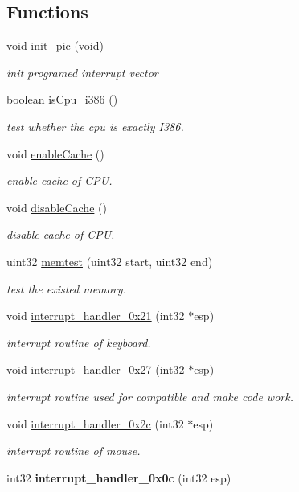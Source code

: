 \subsection*{Functions}
\begin{DoxyCompactItemize}
\item 
void \hyperlink{group__hal_gafbc0dbef6f15e2df21b38724ea38c483}{init\+\_\+pic} (void)
\begin{DoxyCompactList}\small\item\em init programed interrupt vector \end{DoxyCompactList}\item 
boolean \hyperlink{group__hal_ga950bdcbc93f8f964e5725e1aa8b3b5ca}{is\+Cpu\+\_\+i386} ()
\begin{DoxyCompactList}\small\item\em test whether the cpu is exactly I386. \end{DoxyCompactList}\item 
void \hyperlink{group__hal_gaa6c71ad32c0f9672da37fb41f7c061ea}{enable\+Cache} ()
\begin{DoxyCompactList}\small\item\em enable cache of C\+P\+U. \end{DoxyCompactList}\item 
void \hyperlink{group__hal_ga6f714ef9aafc948538caa3ca15a508cc}{disable\+Cache} ()
\begin{DoxyCompactList}\small\item\em disable cache of C\+P\+U. \end{DoxyCompactList}\item 
uint32 \hyperlink{group__hal_ga81897fb798b4a6de7461ec60532ba18c}{memtest} (uint32 start, uint32 end)
\begin{DoxyCompactList}\small\item\em test the existed memory. \end{DoxyCompactList}\item 
void \hyperlink{group__hal_ga69b08db00a381a9cad104bb62187a878}{interrupt\+\_\+handler\+\_\+0x21} (int32 $\ast$esp)
\begin{DoxyCompactList}\small\item\em interrupt routine of keyboard. \end{DoxyCompactList}\item 
void \hyperlink{group__hal_gaf6af72f1d0cb5d5742c565576f375591}{interrupt\+\_\+handler\+\_\+0x27} (int32 $\ast$esp)
\begin{DoxyCompactList}\small\item\em interrupt routine used for compatible and make code work. \end{DoxyCompactList}\item 
void \hyperlink{group__hal_gad9f893ba050719bae099b3b1d5d1146c}{interrupt\+\_\+handler\+\_\+0x2c} (int32 $\ast$esp)
\begin{DoxyCompactList}\small\item\em interrupt routine of mouse. \end{DoxyCompactList}\item 
\hypertarget{group__hal_ga9a683e6357146e328c456aca95e63d6e}{}int32 {\bfseries interrupt\+\_\+handler\+\_\+0x0c} (int32 esp)\label{group__hal_ga9a683e6357146e328c456aca95e63d6e}


\end{DoxyCompactItemize}
